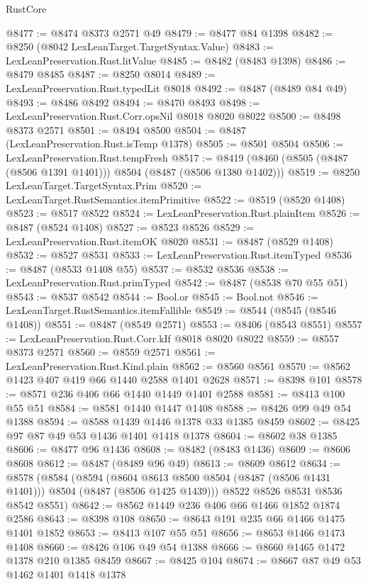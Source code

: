 \begin{lexlean}{RustCore}
\begin{coremodule}
@8477 := @8474 @8373 @2571 @49
@8479 := @8477 @84 @1398
@8482 := @8250 (@8042 LexLeanTarget.TargetSyntax.Value)
@8483 := LexLeanPreservation.Rust.litValue
@8485 := @8482 (@8483 @1398)
@8486 := @8479 @8485
@8487 := @8250 @8014
@8489 := LexLeanPreservation.Rust.typedLit @8018
@8492 := @8487 (@8489 @84 @49)
@8493 := @8486 @8492
@8494 := @8470 @8493
@8498 := LexLeanPreservation.Rust.Corr.opsNil @8018 @8020 @8022
@8500 := @8498 @8373 @2571
@8501 := @8494 @8500
@8504 := @8487 (LexLeanPreservation.Rust.isTemp @1378)
@8505 := @8501 @8504
@8506 := LexLeanPreservation.Rust.tempFresh
@8517 := @8419 (@8460 (@8505 (@8487 (@8506 @1391 @1401))) @8504 (@8487 (@8506 @1380 @1402)))
@8519 := @8250 LexLeanTarget.TargetSyntax.Prim
@8520 := LexLeanTarget.RustSemantics.itemPrimitive
@8522 := @8519 (@8520 @1408)
@8523 := @8517 @8522
@8524 := LexLeanPreservation.Rust.plainItem
@8526 := @8487 (@8524 @1408)
@8527 := @8523 @8526
@8529 := LexLeanPreservation.Rust.itemOK @8020
@8531 := @8487 (@8529 @1408)
@8532 := @8527 @8531
@8533 := LexLeanPreservation.Rust.itemTyped
@8536 := @8487 (@8533 @1408 @55)
@8537 := @8532 @8536
@8538 := LexLeanPreservation.Rust.primTyped
@8542 := @8487 (@8538 @70 @55 @51)
@8543 := @8537 @8542
@8544 := Bool.or
@8545 := Bool.not
@8546 := LexLeanTarget.RustSemantics.itemFallible
@8549 := @8544 (@8545 (@8546 @1408))
@8551 := @8487 (@8549 @2571)
@8553 := @8406 (@8543 @8551)
@8557 := LexLeanPreservation.Rust.Corr.kIf @8018 @8020 @8022
@8559 := @8557 @8373 @2571
@8560 := @8559 @2571
@8561 := LexLeanPreservation.Rust.Kind.plain
@8562 := @8560 @8561
@8570 := @8562 @1423 @407 @419 @66 @1440 @2588 @1401 @2628
@8571 := @8398 @101
@8578 := @8571 @236 @406 @66 @1440 @1449 @1401 @2588
@8581 := @8413 @100 @55 @51
@8584 := @8581 @1440 @1447 @1408
@8588 := @8426 @99 @49 @54 @1388
@8594 := @8588 @1439 @1446 @1378 @33 @1385 @8459
@8602 := @8425 @97 @87 @49 @53 @1436 @1401 @1418 @1378
@8604 := @8602 @38 @1385
@8606 := @8477 @96 @1436
@8608 := @8482 (@8483 @1436)
@8609 := @8606 @8608
@8612 := @8487 (@8489 @96 @49)
@8613 := @8609 @8612
@8634 := @8578
    (@8584
      (@8594
        (@8604 @8613 @8500 @8504 (@8487 (@8506 @1431 @1401)))
        @8504
        (@8487 (@8506 @1425 @1439)))
      @8522
      @8526
      @8531
      @8536
      @8542
      @8551)
@8642 := @8562 @1449 @236 @406 @66 @1466 @1852 @1874 @2586
@8643 := @8398 @108
@8650 := @8643 @191 @235 @66 @1466 @1475 @1401 @1852
@8653 := @8413 @107 @55 @51
@8656 := @8653 @1466 @1473 @1408
@8660 := @8426 @106 @49 @54 @1388
@8666 := @8660 @1465 @1472 @1378 @210 @1385 @8459
@8667 := @8425 @104
@8674 := @8667 @87 @49 @53 @1462 @1401 @1418 @1378

\end{coremodule}
\end{lexlean}
